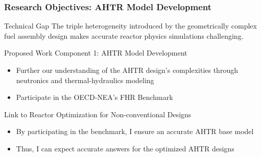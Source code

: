 \begin{frame}
  \frametitle{Research Objectives: AHTR Model Development}
  \begin{block}{Technical Gap}
      The triple heterogeneity introduced by the geometrically complex 
      fuel assembly design makes accurate reactor physics simulations challenging. 
  \end{block}
  \begin{block}{Proposed Work Component 1: AHTR Model Development}
    \begin{itemize}
      \item Further our understanding of the AHTR design's complexities 
      through neutronics and thermal-hydraulics modeling
      \item Participate in the OECD-NEA's FHR Benchmark 
    \end{itemize}
  \end{block}
  \begin{block}{Link to Reactor Optimization for Non-conventional Designs}
  \begin{itemize}
    \item By participating in the benchmark, I ensure an accurate AHTR base model
    \item Thus, I can expect accurate answers for the optimized AHTR designs
  \end{itemize}
  \end{block}
\end{frame}